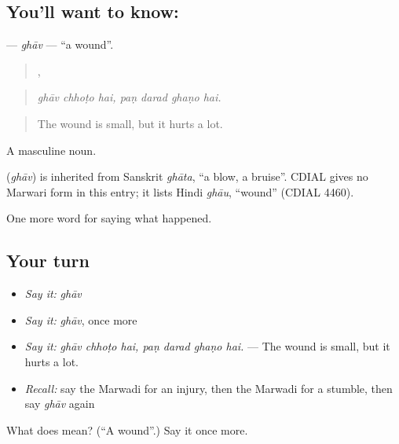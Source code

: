 \subsection*{You'll want to know: }
\textbf{} — \emph{ghāv} — \textquotedblleft{}a wound\textquotedblright{}.

\begin{quote}
  ,    
\end{quote}

\begin{quote}
\emph{ghāv chhoṭo hai, paṇ darad ghaṇo hai.}
\end{quote}

\begin{quote}
The wound is small, but it hurts a lot.
\end{quote}

A masculine noun.

\begin{cousinweb}
\textbf{} (\emph{ghāv}) is inherited from Sanskrit \emph{ghāta}, \textquotedblleft{}a blow, a bruise\textquotedblright{}. CDIAL gives no Marwari form in this entry; it lists Hindi \emph{ghāu}, \textquotedblleft{}wound\textquotedblright{} (CDIAL 4460).
\end{cousinweb}

\begin{grammarlens}[title={What you've built}]
One more word for saying what happened.
\end{grammarlens}

\subsection*{Your turn}
\begin{itemize}
\raggedright
  \item \emph{Say it:} \emph{ghāv}
  \item \emph{Say it:} \emph{ghāv}, once more
  \item \emph{Say it:} \emph{ghāv chhoṭo hai, paṇ darad ghaṇo hai.} — The wound is small, but it hurts a lot.
  \item \emph{Recall:} say the Marwadi for an injury, then the Marwadi for a stumble, then say \emph{ghāv} again
\end{itemize}

\begin{tcolorbox}[breakable,colback=teal!4,colframe=teal!35!black,title={Before you move on}]
What does  mean? (\textquotedblleft{}A wound\textquotedblright{}.) Say it once more.
\end{tcolorbox}
